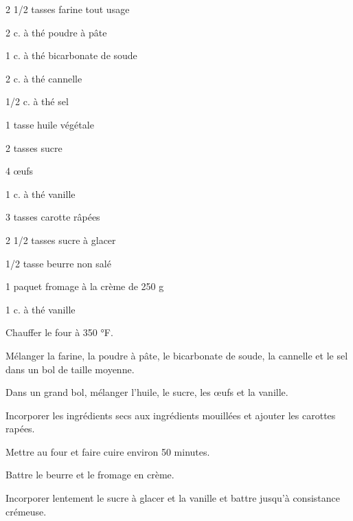 


\totaltime{}


\begin{ingredients}
    \item[] 
    \item 2 1/2 tasses farine tout usage
    \item 2 c. à thé poudre à pâte
    \item 1 c. à thé bicarbonate de soude
    \item 2 c. à thé cannelle
    \item 1/2 c. à thé sel
    \item 1 tasse huile végétale
    \item 2 tasses sucre
    \item 4 œufs
    \item 1 c. à thé vanille
    \item 3 tasses carotte râpées
    \\
    \item[] 
    \item 2 1/2 tasses sucre à glacer
    \item 1/2 tasse beurre non salé
    \item 1 paquet fromage à la crème de 250 g
    \item 1 c. à thé vanille
\end{ingredients}

\begin{steps}
    \item[] 
    \item Chauffer le four à 350 °F.
    \item Mélanger la farine, la poudre à pâte, le bicarbonate de soude, la cannelle et le sel dans un bol de taille moyenne.
    \item Dans un grand bol, mélanger l'huile, le sucre, les œufs et la vanille.
    \item Incorporer les ingrédients secs aux ingrédients mouillées et ajouter les carottes rapées.
    \item Mettre au four et faire cuire environ 50 minutes.
    \\
    \item[] 
    \item Battre le beurre et le fromage en crème.
    \item Incorporer lentement le sucre à glacer et la vanille et battre jusqu'à consistance crémeuse.
\end{steps}
